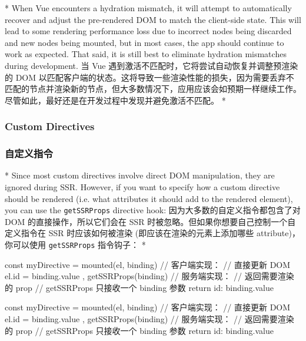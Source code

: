 \begin{paracol}{2} 
   
\switchcolumn[0]*%
When Vue encounters a hydration mismatch, it will attempt to
automatically recover and adjust the pre-rendered DOM to match the
client-side state. This will lead to some rendering performance loss due
to incorrect nodes being discarded and new nodes being mounted, but in
most cases, the app should continue to work as expected. That said, it
is still best to eliminate hydration mismatches during development.
\switchcolumn
当 Vue 遇到激活不匹配时，它将尝试自动恢复并调整预渲染的 DOM
以匹配客户端的状态。这将导致一些渲染性能的损失，因为需要丢弃不匹配的节点并渲染新的节点，但大多数情况下，应用应该会如预期一样继续工作。尽管如此，最好还是在开发过程中发现并避免激活不匹配。
\switchcolumn[0]*%
\subsubsection{Custom Directives}
\switchcolumn
\subsubsection{自定义指令}
\switchcolumn[0]*%
Since most custom directives involve direct DOM manipulation, they are
ignored during SSR. However, if you want to specify how a custom
directive should be rendered (i.e. what attributes it should add to the
rendered element), you can use the \texttt{getSSRProps} directive hook:
\switchcolumn
因为大多数的自定义指令都包含了对 DOM 的直接操作，所以它们会在 SSR
时被忽略。但如果你想要自己控制一个自定义指令在 SSR 时应该如何被渲染
(即应该在渲染的元素上添加哪些 attribute)，你可以使用
\texttt{getSSRProps} 指令钩子：
\switchcolumn[0]*%
\begin{codeJs}
const myDirective = {
  mounted(el, binding) {
    // 客户端实现：
    // 直接更新 DOM
    el.id = binding.value
  },
  getSSRProps(binding) {
    // 服务端实现：
    // 返回需要渲染的 prop
    // getSSRProps 只接收一个 binding 参数
    return {
      id: binding.value
    }
  }
}
\end{codeJs}
\switchcolumn
\begin{codeJs}
const myDirective = {
  mounted(el, binding) {
    // 客户端实现：
    // 直接更新 DOM
    el.id = binding.value
  },
  getSSRProps(binding) {
    // 服务端实现：
    // 返回需要渲染的 prop
    // getSSRProps 只接收一个 binding 参数
    return {
      id: binding.value
    }
  }
}
\end{codeJs}
\end{paracol}



